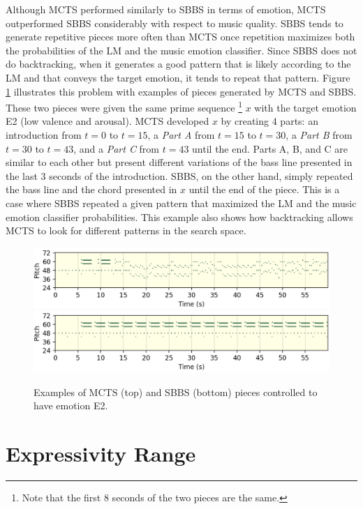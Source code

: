 Although MCTS performed similarly to SBBS in terms of emotion, MCTS outperformed SBBS considerably with respect to music quality. SBBS tends to generate repetitive pieces more often than MCTS once repetition maximizes both the probabilities of the LM and the music emotion classifier. Since SBBS does not do backtracking, when it generates a good pattern that is likely according to the LM and that conveys the target emotion, it tends to repeat that pattern. Figure \ref{fig:ex_pieces} illustrates this problem with examples of pieces generated by MCTS and SBBS. These two pieces were given the same prime sequence \footnote{Note that the first 8 seconds of the two pieces are the same.} $x$ with the target emotion E2 (low valence and arousal). MCTS developed $x$ by creating 4 parts: an introduction from $t=0$ to $t=15$, a \textit{Part A} from $t=15$ to $t=30$, a \textit{Part B} from $t=30$ to $t=43$, and a \textit{Part C} from $t=43$ until the end. Parts A, B, and C are similar to each other but present different variations of the bass line presented in the last 3 seconds of the introduction. SBBS, on the other hand, simply repeated the bass line and the chord presented in $x$ until the end of the piece. This is a case where SBBS repeated a given pattern that maximized the LM and the music emotion classifier probabilities. This example also shows how backtracking allows MCTS to look for different patterns in the search space.

\begin{figure}[h]
\centering
 \includegraphics[width=\columnwidth]{imgs/ismir21/mucts_piece_2_14.png}
 \includegraphics[width=\columnwidth]{imgs/ismir21/sbbs_piece_2_14.png}
 \caption{Examples of MCTS (top) and SBBS (bottom) pieces controlled to have emotion E2.}
 \label{fig:ex_pieces}
\end{figure}

\section{Expressivity Range}

